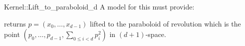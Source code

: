 \begin{ccRefFunctionObjectConcept}{Kernel::Lift_to_paraboloid_d}
A model for this must provide:


 {returns $p = (x_0,\ldots,x_{d-1})$ lifted to the paraboloid of
  revolution which is the point $(p_0, \ldots,p_{d-1},\sum_{0 \le i <
    d}p_i^2)$ in $(d+1)$-space.}

\end{ccRefFunctionObjectConcept}
